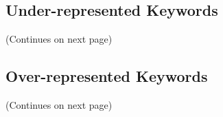 

\subsection{Under-represented Keywords}

\vfill
\begin{center}
(Continues on next page)
\end{center}
\vfill

\begin{center}

\end{center}








\subsection{Over-represented Keywords}

\vfill
\begin{center}
(Continues on next page)
\end{center}
\vfill

\begin{center}

\end{center}




